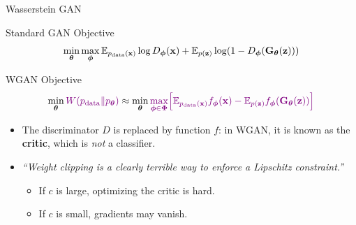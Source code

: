 \documentclass{beamer}
\begin{document}
\begin{frame}{Wasserstein GAN}
	\begin{block}{Standard GAN Objective}
		\vspace{-0.2cm}
		\[
			\min_{\boldsymbol{\theta}} \max_{\boldsymbol{\phi}} \mathbb{E}_{p_{\text{data}}(\mathbf{x})} \log D_{\boldsymbol{\phi}}(\mathbf{x}) + \mathbb{E}_{p(\mathbf{z})} \log (1 - D_{\boldsymbol{\phi}}(\mathbf{G}_{\boldsymbol{\theta}}(\mathbf{z})))
		\]
		\vspace{-0.3cm}
	\end{block}
	\begin{block}{WGAN Objective}
		\vspace{-0.3cm}
		\[
			\min_{\boldsymbol{\theta}} {\color{violet}W(p_{\text{data}} \| p_{\boldsymbol{\theta}})} \approx \min_{\boldsymbol{\theta}} {\color{violet}\max_{\boldsymbol{\phi} \in \boldsymbol{\Phi}} \Bigl[ \mathbb{E}_{p_{\text{data}}(\mathbf{x})} f_{\boldsymbol{\phi}}(\mathbf{x})  - \mathbb{E}_{p(\mathbf{z})} f_{\boldsymbol{\phi}}(\mathbf{G}_{\boldsymbol{\theta}}(\mathbf{z}))\Bigr]}
		\]
		\vspace{-0.3cm}
	\end{block}
	\eqpause
	\begin{itemize}
		\item The discriminator $D$ is replaced by function $f$: in WGAN, it is known as the \textbf{critic}, which is \emph{not} a classifier.
		\item \textit{``Weight clipping is a clearly terrible way to enforce a Lipschitz constraint.''}
		\begin{itemize}
			\item If $c$ is large, optimizing the critic is hard.
			\item If $c$ is small, gradients may vanish.
		\end{itemize}
	\end{itemize}	
\end{frame}
\end{document}

